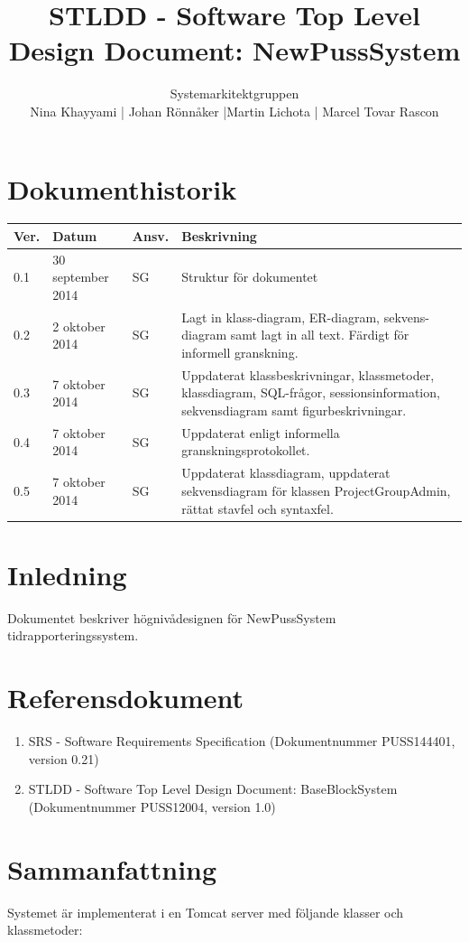 \documentclass[a4paper]{article}
\title{STLDD - Software Top Level Design Document: NewPussSystem}
\author{Systemarkitektgruppen \\ Nina Khayyami | Johan Rönnåker |Martin Lichota | Marcel Tovar Rascon}
\date{}
\begin{document}
\maketitle
\thispagestyle{fancy}
\tableofcontents
\newpage

\section*{Dokumenthistorik}

\begin{tabular}{ l l l p{8.5cm} }
Ver. & Datum & Ansv. & Beskrivning \\\hline
0.1 & 30 september 2014 & SG & Struktur för dokumentet\\
0.2 & 2 oktober 2014 & SG & Lagt in klass-diagram, ER-diagram, sekvens-diagram samt lagt in all text. Färdigt för informell granskning.\\
0.3 & 7 oktober 2014 & SG & Uppdaterat klassbeskrivningar, klassmetoder, klassdiagram, SQL-frågor, sessionsinformation, sekvensdiagram samt figurbeskrivningar.\\
0.4 & 7 oktober 2014 & SG & Uppdaterat enligt informella granskningsprotokollet.\\
0.5 & 7 oktober 2014 & SG & Uppdaterat klassdiagram, uppdaterat sekvensdiagram för klassen ProjectGroupAdmin, rättat stavfel och syntaxfel.


\end{tabular}
\newpage
\section{Inledning}       
Dokumentet beskriver högnivådesignen för NewPussSystem tidrapporteringssystem.



\section{Referensdokument}
\begin{enumerate}
\item SRS - Software Requirements Specification (Dokumentnummer PUSS144401, version 0.21)
\item STLDD - Software Top Level Design Document: BaseBlockSystem (Dokumentnummer PUSS12004, version 1.0)
\end{enumerate}



\section{Sammanfattning}
Systemet är implementerat i en Tomcat server med följande klasser och klassmetoder:
\end{document}
